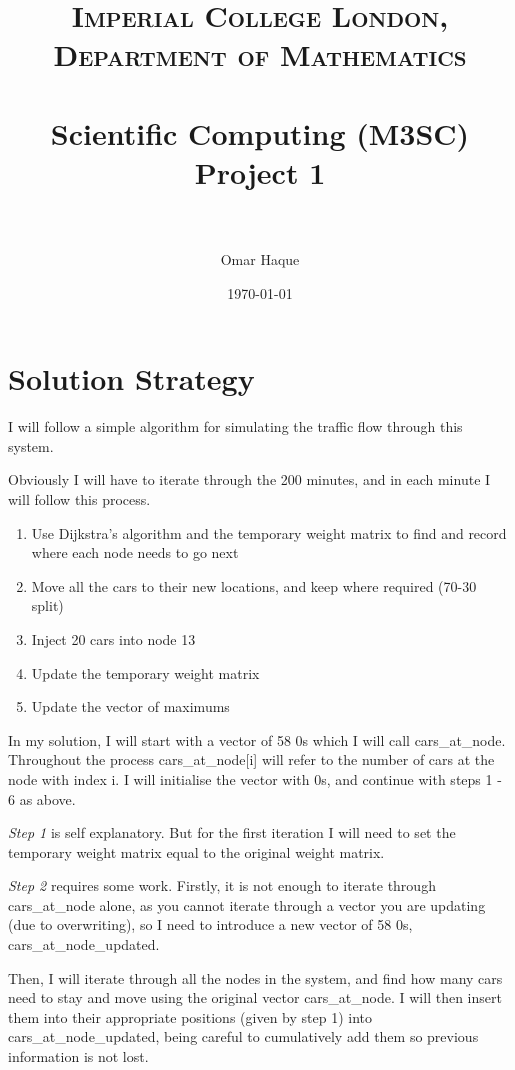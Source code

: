 \documentclass[paper=a4, fontsize=12pt]{scrartcl} %
\title{
\normalfont \normalsize
\textsc{Imperial College London, Department of Mathematics} \\ [25pt]
\horrule{0.5pt} \\[0.4cm]                      %
\huge Scientific Computing (M3SC) Project 1 \\           %
\horrule{2pt} \\[0.5cm]                        %
}
\author{Omar Haque}
\date{\normalsize\today}
\numberwithin{equation}{section}       %
\numberwithin{figure}{section}         %
\numberwithin{table}{section}          %
\begin{document}

\maketitle

\section{Solution Strategy}

I will follow a simple algorithm for simulating the traffic flow through this system.

Obviously I will have to iterate through the 200 minutes, and in each minute I will follow this process.

\begin{enumerate}
\item Use Dijkstra's algorithm and the temporary weight matrix to find and record where each node needs to go next
\item Move all the cars to their new locations, and keep where required (70-30 split)
\item Inject 20 cars into node 13
\item Update the temporary weight matrix
\item Update the vector of maximums
\end{enumerate}

In my solution, I will start with a vector of 58 0s which I will call cars\_at\_node. Throughout the process cars\_at\_node[i] will refer to the number of cars at the node with index i. I will initialise the vector with 0s, and continue with steps 1 - 6 as above. \newline

\textit{Step 1} is self explanatory. But for the first iteration I will need to set the temporary weight matrix equal to the original weight matrix.
\leavevmode
\newline

\textit{Step 2} requires some work. Firstly, it is not enough to iterate through cars\_at\_node alone, as you cannot iterate through a vector you are updating (due to overwriting), so I need to introduce a new vector of 58 0s, cars\_at\_node\_updated. 

Then, I will iterate through all the nodes in the system, and find how many cars need to stay and move using the original vector cars\_at\_node. I will then insert them into their appropriate positions (given by step 1) into cars\_at\_node\_updated, being careful to cumulatively add them so previous information is not lost.
\end{document}
